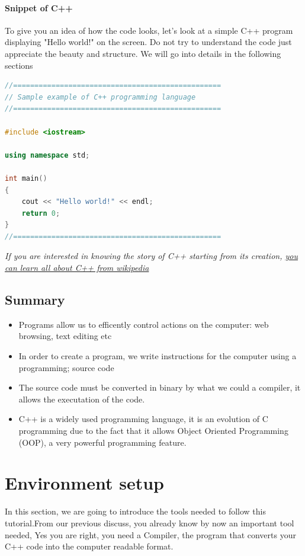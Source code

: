 \documentclass[11pt, a4paper]{article}
\begin{document}
\paragraph{Snippet of C++}
To give you an idea of how the code looks, let's look at a simple C++ program displaying "Hello world!"
on the screen. Do not try to understand the code just appreciate the beauty and structure. We will
go into details in the following sections

\begin{lstlisting}[caption=Sample example of C++ programming language, style=chstyle, language=C++]
//=================================================
// Sample example of C++ programming language
//=================================================

#include <iostream>

using namespace std;

int main()
{
    cout << "Hello world!" << endl;
    return 0;
}
//=================================================
\end{lstlisting}
\textit{ If you are interested in knowing the story of C++ starting from its creation,
\href{https://en.wikipedia.org/wiki/Bjarne_Stroustrup}{you can learn all about C++ from wikipedia}}

\subsection{Summary}
\begin{itemize}
    \item Programs allow us to efficently control actions on the computer: web browsing, text editing etc
    \item In order to create a program, we write instructions for the computer using a programming; source code
    \item The source code must be converted in binary by what we could a compiler, it allows the executation 
    of the code.
    \item  C++ is a widely used programming language, it is an evolution of C programming due to the fact that 
    it allows Object Oriented Programming (OOP), a very powerful programming feature.
\end{itemize}
\newpage

\section{Environment setup}
In this section, we are going to introduce the tools needed to follow
this tutorial.From our previous discuss, you already know by now an important
tool needed, Yes you are right, you need a Compiler, the program that
converts your C++ code into the computer readable format.
\end{document}

